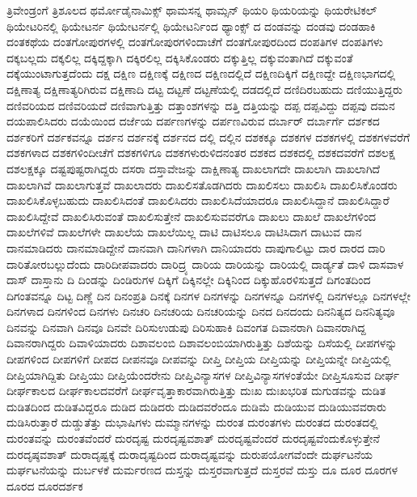 {ತ್ರಿವೇಂಡ್ರಂಗೆ
ತ್ರಿಶೂಲದ
ಥರ್ಮೋಡೈನಾಮಿಕ್ಸ್
ಥಾಮಸನ್ನ
ಥಾಮ್ಸನ್
ಥಿಯರಿ
ಥಿಯರಿಯನ್ನು
ಥಿಯರೇಟಿಕಲ್
ಥಿಯೇಟರಿನಲ್ಲಿ
ಥಿಯೇಟರ್ನ
ಥಿಯೇಟರ್ನಲ್ಲಿ
ಥಿಯೇಟರ್ನಿಂದ
ಥ್ಯಾಂಕ್ಸ್
ದ
ದಂಡವನ್ನು
ದಂಡವು
ದಂಡಹಾಕಿ
ದಂತಕಥೆಯ
ದಂತಗೋಪುರಗಳಲ್ಲಿ
ದಂತಗೋಪುರಗಳಿಂದಾಚೆಗೆ
ದಂತಗೋಪುರದಿಂದ
ದಂಪತಿಗಳ
ದಂಪತಿಗಳು
ದಕ್ಕಬಲ್ಲದು
ದಕ್ಕಲಿಲ್ಲ
ದಕ್ಕಿದ್ದಕ್ಕಾಗಿ
ದಕ್ಕಿರಲಿಲ್ಲ
ದಕ್ಕಿಸಿಕೊಂಡರು
ದಕ್ಕುತ್ತಿಲ್ಲ
ದಕ್ಕುವಂತಾಗಿದೆ
ದಕ್ಕುವಂತೆ
ದಕ್ಕೆಯುಂಟಾಗುತ್ತದೆಂದು
ದಕ್ಷ
ದಕ್ಷಿಣ
ದಕ್ಷಿಣಕ್ಕೆ
ದಕ್ಷಿಣದ
ದಕ್ಷಿಣದಲ್ಲಿದೆ
ದಕ್ಷಿಣದಿಕ್ಕಿಗೆ
ದಕ್ಷಿಣದ್ದೇ
ದಕ್ಷಿಣಭಾಗದಲ್ಲಿ
ದಕ್ಷಿಣಾತ್ಯ
ದಕ್ಷಿಣಾತ್ಯರಿಗಿರುವ
ದಕ್ಷಿಣಾದಿ
ದಟ್ಟ
ದಟ್ಟಣೆ
ದಟ್ಟಣೆಯಲ್ಲಿ
ದಡದಲ್ಲಿದೆ
ದಣಿದಿರಬಹುದು
ದಣಿಯುತ್ತಿದ್ದರು
ದಣಿವರಿಯದ
ದಣಿವರಿಯದೆ
ದಣಿವಾಗುತ್ತಿತ್ತು
ದತ್ತಾಂಶಗಳನ್ನು
ದತ್ತಿ
ದತ್ತಿಯನ್ನು
ದಪ್ಪ
ದಪ್ಪವಿದ್ದು
ದಪ್ಪವು
ದಮನ
ದಯಪಾಲಿಸಿದರು
ದಯೆಯಿಂದ
ದರ್ಜೆಯ
ದರ್ಪಣಗಳನ್ನು
ದರ್ಪಣವಿರುವ
ದರ್ಬಾರ್
ದರ್ಬಾರ್ಗೆ
ದರ್ಶಕದ
ದರ್ಶಕರಿಗೆ
ದರ್ಶಕವನ್ನೂ
ದರ್ಶನ
ದರ್ಶನಕ್ಕೆ
ದರ್ಶನದ
ದಲ್ಲಿ
ದಲ್ಲಿನ
ದಶಕಕ್ಕೂ
ದಶಕಗಳ
ದಶಕಗಳಲ್ಲಿ
ದಶಕಗಳವರೆಗೆ
ದಶಕಗಳಾದ
ದಶಕಗಳಿಂದೀಚೆಗೆ
ದಶಕಗಳಿಗೂ
ದಶಕಗಳುರುಳಿದನಂತರ
ದಶಕದ
ದಶಕದಲ್ಲಿ
ದಶಕದವರೆಗೆ
ದಶಲಕ್ಷ
ದಶಲಕ್ಷಕ್ಕೂ
ದಷ್ಟಪುಷ್ಟರಾಗಿದ್ದರು
ದಸರಾ
ದಸ್ತಾವೇಜನ್ನು
ದಾಕ್ಷಿಣಾತ್ಯ
ದಾಖಲಾಗದೇ
ದಾಖಲಾಗಿ
ದಾಖಲಾಗಿದೆ
ದಾಖಲಾಗಿವೆ
ದಾಖಲಾಗುತ್ತವೆ
ದಾಖಲಾದರು
ದಾಖಲಿಸತೊಡಗಿದರು
ದಾಖಲಿಸಲು
ದಾಖಲಿಸಿ
ದಾಖಲಿಸಿಕೊಂಡರು
ದಾಖಲಿಸಿಕೊಳ್ಳಬಹುದು
ದಾಖಲಿಸಿದಂತೆ
ದಾಖಲಿಸಿದರು
ದಾಖಲಿಸಿದೆಯಾದರೂ
ದಾಖಲಿಸಿದ್ದಾನೆ
ದಾಖಲಿಸಿದ್ದಾರೆ
ದಾಖಲಿಸಿದ್ದೇವೆ
ದಾಖಲಿಸಿರುವಂತೆ
ದಾಖಲಿಸುತ್ತೇನೆ
ದಾಖಲಿಸುವವರೆಗೂ
ದಾಖಲು
ದಾಖಲೆ
ದಾಖಲೆಗಳಿಂದ
ದಾಖಲೆಗಳಿವೆ
ದಾಖಲೆಗಳೇ
ದಾಖಲೆಯ
ದಾಖಲೆಯಿಲ್ಲ
ದಾಟಿ
ದಾಟಿಸಲೂ
ದಾಟಿಸಿದಾಗ
ದಾಟುವ
ದಾನ
ದಾನಮಾಡಿದರು
ದಾನಮಾಡಿದ್ದೇನೆ
ದಾನವಾಗಿ
ದಾನಿಗಳಾಗಿ
ದಾನಿಯಾದರು
ದಾಪುಗಾಲಿಟ್ಟು
ದಾರ
ದಾರದ
ದಾರಿ
ದಾರಿತೋರಬಲ್ಲುದೆಂದು
ದಾರಿದೀಪವಾದರು
ದಾರಿದ್ರ್ಯ
ದಾರಿಯ
ದಾರಿಯನ್ನು
ದಾರಿಯಲ್ಲಿ
ದಾರ್ಡ್ಯತೆ
ದಾಳಿ
ದಾಸವಾಳ
ದಾಸ್
ದಾಸ್ತಾನು
ದಿ
ದಿಂಡನ್ನು
ದಿಂಡಿರುಗಳ
ದಿಕ್ಕಿಗೆ
ದಿಕ್ಕಿನಲ್ಲೇ
ದಿಕ್ಕಿನಿಂದ
ದಿಕ್ಕುಹೊರಳಿಸುತ್ತದೆ
ದಿಗಂತದಿಂದ
ದಿಗಂತವನ್ನೂ
ದಿಟ್ಟ
ದಿಣ್ಣೆ
ದಿನ
ದಿನಂಪ್ರತಿ
ದಿನಕ್ಕೆ
ದಿನಗಳ
ದಿನಗಳನ್ನು
ದಿನಗಳನ್ನೂ
ದಿನಗಳಲ್ಲಿ
ದಿನಗಳಲ್ಲೂ
ದಿನಗಳಲ್ಲೇ
ದಿನಗಳಾದ
ದಿನಗಳಿಂದ
ದಿನಗಳು
ದಿನಚರಿ
ದಿನಚರಿಯ
ದಿನಚರಿಯನ್ನು
ದಿನದ
ದಿನದಂದು
ದಿನನಿತ್ಯದ
ದಿನನಿತ್ಯವೂ
ದಿನವನ್ನು
ದಿನವಾಗಿ
ದಿನವೂ
ದಿನವೇ
ದಿರಿಸುಉಡುಪು
ದಿರಿಸುಹಾಕಿ
ದಿವಂಗತ
ದಿವಾನರಾಗಿ
ದಿವಾನರಾಗಿದ್ದ
ದಿವಾನರಾಗಿದ್ದರು
ದಿವಾಳಿಯಾದರು
ದಿಶಾವಲಂಬಿ
ದಿಶಾವಲಂಬಿಯಾಗಿರುತ್ತಿತ್ತು
ದಿಶೆಯನ್ನು
ದಿಸೆಯಲ್ಲಿ
ದೀಪಗಳನ್ನು
ದೀಪಗಳಿಂದ
ದೀಪಗಳಿಗೆ
ದೀಪದ
ದೀಪನವೂ
ದೀಪವನ್ನು
ದೀಪ್ತಿ
ದೀಪ್ತಿಯ
ದೀಪ್ತಿಯನ್ನು
ದೀಪ್ತಿಯನ್ನೇ
ದೀಪ್ತಿಯಲ್ಲಿ
ದೀಪ್ತಿಯಾಗಿದ್ದಿತು
ದೀಪ್ತಿಯು
ದೀಪ್ತಿಯೆಂದರೇನು
ದೀಪ್ತಿವಿನ್ಯಾಸಗಳ
ದೀಪ್ತಿವಿನ್ಯಾಸಗಳಂತೆಯೇ
ದೀಪ್ತಿಸೂಸುವ
ದೀರ್ಘ
ದೀರ್ಘಕಾಲದ
ದೀರ್ಘಕಾಲದವರೆಗೆ
ದೀರ್ಘವೃತ್ತಾಕಾರವಾಗಿರುತ್ತಿತ್ತು
ದುಃಖ
ದುಃಖಭರಿತ
ದುಗುಡವನ್ನು
ದುಡಿತ
ದುಡಿತದಿಂದ
ದುಡಿತವಿದ್ದರೂ
ದುಡಿದ
ದುಡಿದರು
ದುಡಿದವರೆಂದೂ
ದುಡಿಮೆ
ದುಡಿಯುವ
ದುಡಿಯುವವರಾರು
ದುಡಿಸಿರುತ್ತಾರೆ
ದುಡ್ಡುತೆತ್ತು
ದುಭಾಷಿಗಳು
ದುಮ್ಮಾನಗಳನ್ನು
ದುರಂತ
ದುರಂತಗಳು
ದುರಂತದ
ದುರಂತದಲ್ಲಿ
ದುರಂತವನ್ನು
ದುರಂತವೆಂದರೆ
ದುರದೃಷ್ಟ
ದುರದೃಷ್ಟವಶಾತ್
ದುರದೃಷ್ಟವೆಂದರೆ
ದುರದೃಷ್ಟವೆಂದುಕೊಳ್ಳುತ್ತೇನೆ
ದುರದೃಷ್ಠವಶಾತ್
ದುರಾದೃಷ್ಟಕ್ಕೆ
ದುರಾದೃಷ್ಟದಿಂದ
ದುರಾದೃಷ್ಟವನ್ನು
ದುರುಪಯೋಗವೆಂದೇ
ದುರ್ಘಟನೆಯ
ದುರ್ಘಟನೆಯನ್ನು
ದುರ್ಬಳಕೆ
ದುರ್ಮರಣದ
ದುಸ್ತನ್ನು
ದುಸ್ತರವಾಗುತ್ತದೆ
ದುಸ್ತರವೆ
ದುಸ್ತು
ದೂ
ದೂರ
ದೂರಗಳ
ದೂರದ
ದೂರದರ್ಶಕ
}

